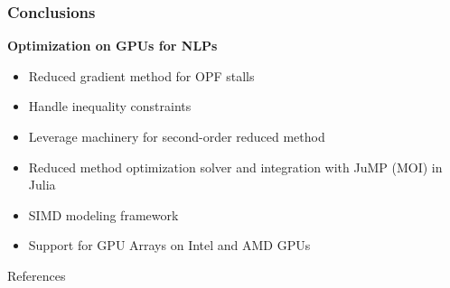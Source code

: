 
\begin{frame}
  \frametitle{Conclusions}
  {\bf Optimization on GPUs for NLPs}
  \begin{itemize}
    \item Reduced gradient method for OPF stalls
    \item Handle inequality constraints
    \item Leverage machinery for second-order reduced method
    \item Reduced method optimization solver and integration with JuMP (MOI) in Julia
    \item SIMD modeling framework
    \item Support for GPU Arrays on Intel and AMD GPUs
  \end{itemize}
\end{frame}

\begin{frame}{References}
    \printbibliography[heading=none]
\end{frame}




